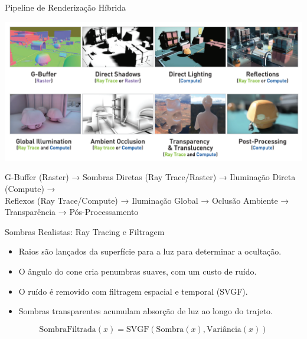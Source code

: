 \documentclass[aspectratio=169,xcolor=table]{beamer}
\begin{document}
\begin{frame}{Pipeline de Renderização Híbrida}
    \begin{center}
        \includegraphics[height=0.8\textheight]{pipeline}
    \end{center}
    \begin{center}
        \small{G-Buffer (Raster) → Sombras Diretas (Ray Trace/Raster) → Iluminação Direta (Compute) → \\
        Reflexos (Ray Trace/Compute) → Iluminação Global → Oclusão Ambiente → Transparência → Pós-Processamento}
    \end{center}
\end{frame}

\begin{frame}{Sombras Realistas: Ray Tracing e Filtragem}
    \begin{itemize}
        \item Raios são lançados da superfície para a luz para determinar a ocultação.
        \item O ângulo do cone cria penumbras suaves, com um custo de ruído.
        \item O ruído é removido com filtragem espacial e temporal (SVGF).
        \item Sombras transparentes acumulam absorção de luz ao longo do trajeto.
    \end{itemize}
    \begin{equation*}
        \text{SombraFiltrada}(x) = \text{SVGF}(\text{Sombra}(x), \text{Variância}(x))
    \end{equation*}
\end{frame}
\end{document}
